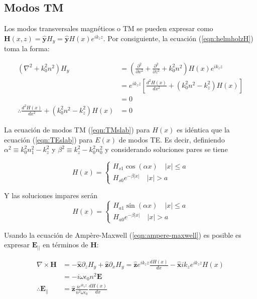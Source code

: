 \subsection{Modos TM}
Los modos transversales magnéticos o TM se pueden expresar como $\textbf{H}(x,z) =\mathbf{\hat{y}} H_y= \mathbf{\hat{y}} H(x)e^{i k_z z }$. Por consiguiente, la ecuación (\ref{eqn:helmholzH}) toma la forma:

\begin{align}
	(\nabla^2 + k_0^2 n^2) H_y
	&= \left(\frac{\partial^2}{\partial x^2} + \frac{\partial^2}{\partial z^2} + k_0^2n^2\right) H(x)e^{ik_z z }
	\nonumber
	\\
&= e^{ik_z z}\left[\frac{d^2  H(x)}{dx^2}  + (k_0^2n^2 -  k_z^2)H(x) \right]
\nonumber	
	\\	
	&= 0 
	\nonumber	
	\\
	\therefore 
	\frac{d^2  H(x)}{dx^2}  + (k_0^2n^2 -  k_z^2)H(x) &= 0
	\label{eqn:TMslab}
\end{align} 

La ecuación de modos TM (\ref{eqn:TMslab}) para $H(x)$ es idéntica que la ecuación (\ref{eqn:TEslab}) para $E(x)$ de modos TE. Es decir, definiendo $\alpha^2\equiv k_0^2n_1^2-k_z^2$ y $\beta^2\equiv k_z^2 - k_0^2n_0^2$ y considerando soluciones pares se tiene

\begin{equation*}
	H(x) = \left\{\begin{matrix}
	H_{s1}\cos(\alpha x)\quad |x|\le a
	\\
	H_{s0}e^{-\beta|x|} \quad |x|>a
	\end{matrix}\right.
\end{equation*}

Y las soluciones impares serán
\begin{equation*}
	H(x) = \left\{\begin{matrix}
	H_{a1}\sin(\alpha x)\quad |x|\le a
	\\
	H_{a0}e^{-\beta|x|} \quad |x|>a
	\end{matrix}\right.
\end{equation*}

Usando la ecuación de Ampère-Maxwell (\ref{eqn:ampere-maxwell}) es posible es expresar $\textbf{E}_{||}$ en términos de $\textbf{H}$:

\begin{align*}
	\nabla\times\textbf{H} &= -\mathbf{\hat{x}} \partial_z H_y+ \mathbf{\hat{z}} \partial_x H_y = \mathbf{\hat{z}} e^{i k_z z }\frac{d H(x)}{dx} - \mathbf{\hat{x}} ik_z  e^{i k_z z } H(x)  
	\\	
	&= -i\omega\epsilon_0 n^2 \textbf{E}
	\\
	\therefore \textbf{E}_{||} &= \mathbf{\hat{z}} \frac{ie^{i k_z z }}{n^2 \omega \epsilon_0} \frac{d H(x)}{dx}
\end{align*} 

